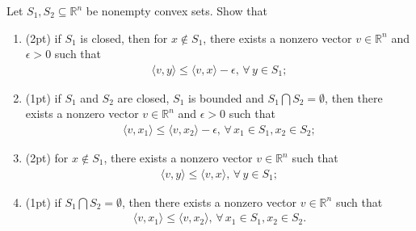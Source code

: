 \documentclass[11pt,letter,notitlepage]{article}
\begin{document}
\begin{exercise}
	Let $S_1, S_2\subseteq\mathbb{R}^n$ be nonempty convex sets.
	Show that
	\begin{enumerate}
		\item (2pt) if $S_1$ is closed, then for $x\notin S_1$, there exists a nonzero vector $v\in\mathbb{R}^n$ and $\epsilon>0$ such that
		\begin{align*}
		\langle v,y\rangle\leq\langle v, x\rangle-\epsilon,\,\forall\,y\in S_1;
		\end{align*}
		
		\item (1pt) if $S_1$ and $S_2$ are closed, $S_1$ is bounded and $S_1\bigcap S_2=\emptyset$, then there exists a nonzero vector $v\in\mathbb{R}^n$ and $\epsilon>0$ such that
		\begin{align*}
			\langle v,x_1\rangle\leq\langle v,x_2\rangle-\epsilon,\,\forall\,x_1\in S_1, x_2\in S_2;
		\end{align*}
		
		\item (2pt) for $x\notin S_1$, there exists a nonzero vector $v\in\mathbb{R}^n$ such that
		\begin{align*}
		\langle v,y\rangle\leq\langle v, x\rangle,\,\forall\,y\in S_1;
		\end{align*}
		
		\item (1pt) if $S_1\bigcap S_2=\emptyset$, then there exists a nonzero vector $v\in\mathbb{R}^n$ such that
		\begin{align*}
		\langle v,x_1\rangle\leq\langle v,x_2\rangle,\,\forall\,x_1\in S_1, x_2\in S_2.
		\end{align*}
	\end{enumerate}
	
\end{exercise}
\end{document}

